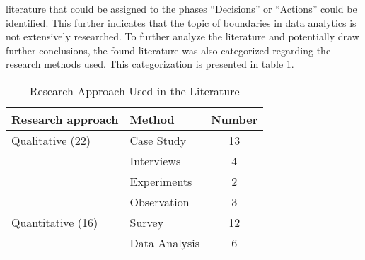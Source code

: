 literature that could be assigned to the phases \enquote{Decisions} or \enquote{Actions} could be identified. This further indicates that the topic of boundaries in data analytics is not extensively researched. To further analyze the literature and potentially draw further conclusions, the found literature was also categorized regarding the research methods used. This categorization is presented in table \ref{researchMethod}.

\begin{table}[htbp]
    \centering
    \small
    \begin{tabular}{llc}
    \hline
    \multicolumn{1}{l}{Research approach} & \multicolumn{1}{l}{Method} & \multicolumn{1}{l}{Number} \\ \hline
    Qualitative (22)                      & Case Study                 & 13                         \\
                                          & Interviews                 & 4                          \\
                                          & Experiments                & 2                          \\
                                          & Observation                & 3                          \\
    Quantitative (16)                     & Survey                     & 12                         \\
                                          & Data Analysis              & 6                          \\ \hline
    \end{tabular}
    \caption{Research Approach Used in the Literature}
    \label{researchMethod}
    \end{table}


